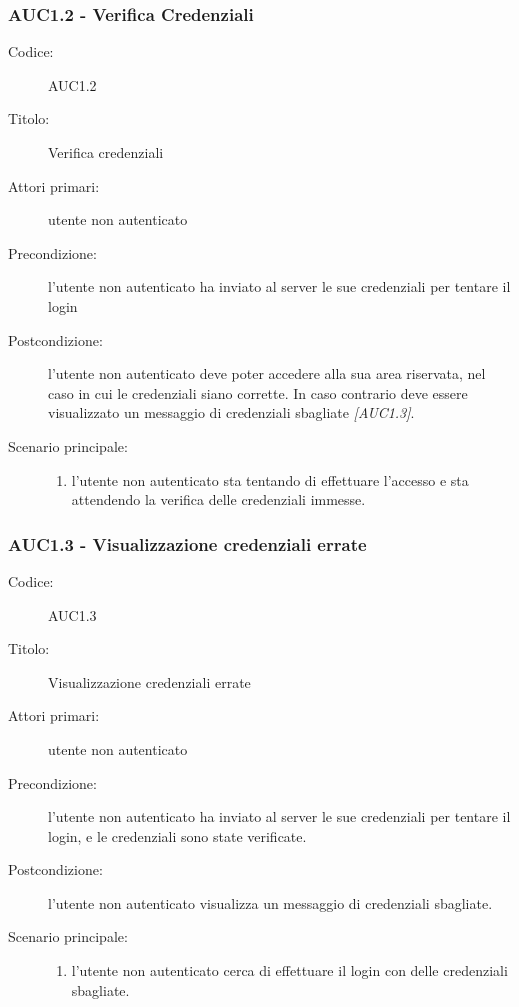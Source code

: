 \documentclass[casi-duso]{subfiles}
\begin{document}
\subsubsection{AUC1.2 - Verifica Credenziali}%
\label{subsub:AUC1.2}
\begin{description}
  \item[Codice:] AUC1.2
  \item[Titolo:] Verifica credenziali
  \item[Attori primari:] utente non autenticato
  \item[Precondizione:] l'utente non autenticato ha inviato al server le sue credenziali per tentare il login
  \item[Postcondizione:] l'utente non autenticato deve poter accedere alla sua area riservata, nel caso in cui le credenziali siano corrette. In caso
  contrario deve essere visualizzato un messaggio di credenziali sbagliate \emph{[AUC1.3]}.
  \item[Scenario principale:]
  \begin{enumerate}
    \item l'utente non autenticato sta tentando di effettuare l'accesso e sta attendendo la verifica delle credenziali immesse.
  \end{enumerate}
\end{description}

\subsubsection{AUC1.3 - Visualizzazione credenziali errate}%
\label{subsub:AUC1.3}
\begin{description}
  \item[Codice:] AUC1.3
  \item[Titolo:] Visualizzazione credenziali errate
  \item[Attori primari:] utente non autenticato
  \item[Precondizione:] l'utente non autenticato ha inviato al server le sue credenziali per tentare il login, e le credenziali sono state verificate.
  \item[Postcondizione:] l'utente non autenticato visualizza un messaggio di credenziali sbagliate.
  \item[Scenario principale:]
  \begin{enumerate}
    \item l'utente non autenticato cerca di effettuare il login con delle credenziali sbagliate.
  \end{enumerate}
\end{description}
\end{document}
